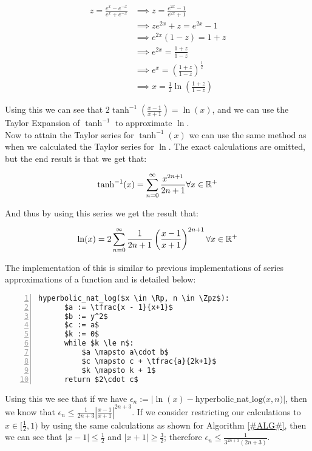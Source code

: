 \begin{align*}
z = \frac{e^x - e^{-x}}{e^x + e^{-x}} 
	&\implies z = \frac{e^{2x} - 1}{e^{2x} + 1}\\
	&\implies ze^{2x} + z = e^{2x} - 1\\
	&\implies e^{2x}(1 - z)=1+z\\
	&\implies e^{2x} = \frac{1+z}{1-z}\\
	&\implies e^{x} = \left(\frac{1+z}{1-z}\right)^{\frac{1}{2}}\\
	&\implies x = \frac{1}{2}\ln\left(\frac{1+z}{1-z}\right)
\end{align*}

Using this we can see that \(2\tanh^{-1}\left(\frac{x-1}{x+1}\right) = \ln(x)\), and we can use the Taylor Expansion of \(\tanh^{-1}\) to approximate \(\ln\).\\

Now to attain the Taylor series for \(\tanh^{-1}(x)\) we can use the same method as when we calculated the Taylor series for \(\ln\). The exact calculations are omitted, but the end result is that we get that:

\[\tanh^{-1}(x) = \sum_{n=0}^\infty\frac{x^{2n+1}}{2n+1} \forall x \in \mathbb{R}^+\]

And thus by using this series we get the result that:

\[\ln(x) = 2\sum_{n=0}^\infty\frac{1}{2n+1}\left(\frac{x-1}{x+1}\right)^{2n+1}\forall x \in \mathbb{R}^+\]

The implementation of this is similar to previous implementations of series approximations of a function and is detailed below:

\begin{lstlisting}[numbers=left,frame=single,mathescape,caption={Hyperbolic seies method for \(\ln\)},label={PCD_"hyperbolic ln"}]
  hyperbolic_nat_log($x \in \Rp, n \in \Zpz$):
      $a := \tfrac{x - 1}{x+1}$
      $b := y^2$
      $c := a$
      $k := 0$
      while $k \le n$:
          $a \mapsto a\cdot b$
          $c \mapsto c + \tfrac{a}{2k+1}$
          $k \mapsto k + 1$
      return $2\cdot c$
\end{lstlisting}

Using this we see that if we have \(\epsilon_n := |\ln(x) - \textrm{hyperbolic\_nat\_log(}x, n\textrm{)}|\), then we know that \(\epsilon_n \le \frac{1}{2n + 3}\left|\frac{x-1}{x+1}\right|^{2n+3}\). If we consider restricting our calculations to \(x \in [\tfrac{1}{2}, 1)\) by using the  same calculations as shown for Algorithm \ref{#ALG#}, then we can see that \(|x - 1| \le \frac{1}{2}\) and \(|x+1| \ge \frac{3}{2}\); therefore \(\epsilon_n \le \frac{1}{3^{2n+3}(2n+3)}\).\\

